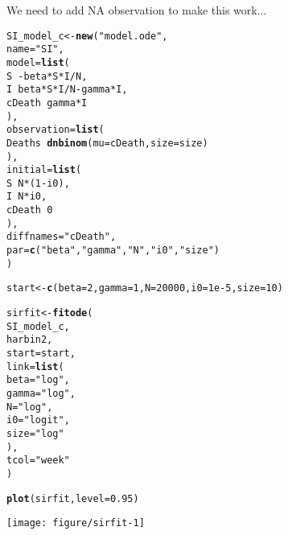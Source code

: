 \documentclass{article}\usepackage[]{graphicx}\usepackage[]{color}
\makeatletter
\def\maxwidth{ %
  \ifdim\Gin@nat@width>\linewidth
    \linewidth
  \else
    \Gin@nat@width
  \fi
}
\newcommand{\hlnum}[1]{\textcolor[rgb]{0.686,0.059,0.569}{#1}}%
\newcommand{\hlstr}[1]{\textcolor[rgb]{0.192,0.494,0.8}{#1}}%
\newcommand{\hlopt}[1]{\textcolor[rgb]{0,0,0}{#1}}%
\newcommand{\hlstd}[1]{\textcolor[rgb]{0.345,0.345,0.345}{#1}}%
\newcommand{\hlkwb}[1]{\textcolor[rgb]{0.69,0.353,0.396}{#1}}%
\newcommand{\hlkwc}[1]{\textcolor[rgb]{0.333,0.667,0.333}{#1}}%
\newcommand{\hlkwd}[1]{\textcolor[rgb]{0.737,0.353,0.396}{\textbf{#1}}}%
\newenvironment{kframe}{%
 \def\at@end@of@kframe{}%
 \ifinner\ifhmode%
  \def\at@end@of@kframe{\end{minipage}}%
  \begin{minipage}{\columnwidth}%
 \fi\fi%
 \def\FrameCommand##1{\hskip\@totalleftmargin \hskip-\fboxsep
 \colorbox{shadecolor}{##1}\hskip-\fboxsep
     \hskip-\linewidth \hskip-\@totalleftmargin \hskip\columnwidth}%
 \MakeFramed {\advance\hsize-\width
   \@totalleftmargin\z@ \linewidth\hsize
   \@setminipage}}%
 {\par\unskip\endMakeFramed%
 \at@end@of@kframe}
\newenvironment{knitrout}{}{} %
\makeatother
\begin{document}
We need to add NA observation to make this work...

\begin{knitrout}
\color{fgcolor}\begin{kframe}
\begin{alltt}
\hlstd{SI_model_c} \hlkwb{<-} \hlkwd{new}\hlstd{(}\hlstr{"model.ode"}\hlstd{,}
    \hlkwc{name} \hlstd{=} \hlstr{"SI"}\hlstd{,}
    \hlkwc{model} \hlstd{=} \hlkwd{list}\hlstd{(}
        \hlstd{S} \hlopt{~ -} \hlstd{beta}\hlopt{*}\hlstd{S}\hlopt{*}\hlstd{I}\hlopt{/}\hlstd{N,}
        \hlstd{I} \hlopt{~} \hlstd{beta}\hlopt{*}\hlstd{S}\hlopt{*}\hlstd{I}\hlopt{/}\hlstd{N} \hlopt{-} \hlstd{gamma}\hlopt{*}\hlstd{I,}
        \hlstd{cDeath} \hlopt{~} \hlstd{gamma}\hlopt{*}\hlstd{I}
    \hlstd{),}
    \hlkwc{observation} \hlstd{=} \hlkwd{list}\hlstd{(}
        \hlstd{Deaths} \hlopt{~} \hlkwd{dnbinom}\hlstd{(}\hlkwc{mu}\hlstd{=cDeath,} \hlkwc{size}\hlstd{=size)}
    \hlstd{),}
    \hlkwc{initial} \hlstd{=} \hlkwd{list}\hlstd{(}
        \hlstd{S} \hlopt{~} \hlstd{N} \hlopt{*} \hlstd{(}\hlnum{1} \hlopt{-} \hlstd{i0),}
        \hlstd{I} \hlopt{~} \hlstd{N} \hlopt{*} \hlstd{i0,}
        \hlstd{cDeath} \hlopt{~} \hlnum{0}
    \hlstd{),}
    \hlkwc{diffnames}\hlstd{=}\hlstr{"cDeath"}\hlstd{,}
    \hlkwc{par}\hlstd{=}\hlkwd{c}\hlstd{(}\hlstr{"beta"}\hlstd{,} \hlstr{"gamma"}\hlstd{,} \hlstr{"N"}\hlstd{,} \hlstr{"i0"}\hlstd{,} \hlstr{"size"}\hlstd{)}
\hlstd{)}

\hlstd{start} \hlkwb{<-} \hlkwd{c}\hlstd{(}\hlkwc{beta}\hlstd{=}\hlnum{2}\hlstd{,} \hlkwc{gamma}\hlstd{=}\hlnum{1}\hlstd{,} \hlkwc{N}\hlstd{=}\hlnum{20000}\hlstd{,} \hlkwc{i0}\hlstd{=}\hlnum{1e-5}\hlstd{,} \hlkwc{size}\hlstd{=}\hlnum{10}\hlstd{)}

\hlstd{sirfit} \hlkwb{<-} \hlkwd{fitode}\hlstd{(}
    \hlstd{SI_model_c,}
    \hlstd{harbin2,}
    \hlkwc{start}\hlstd{=start,}
    \hlkwc{link} \hlstd{=} \hlkwd{list}\hlstd{(}
        \hlkwc{beta}\hlstd{=}\hlstr{"log"}\hlstd{,}
        \hlkwc{gamma}\hlstd{=}\hlstr{"log"}\hlstd{,}
        \hlkwc{N}\hlstd{=}\hlstr{"log"}\hlstd{,}
        \hlkwc{i0}\hlstd{=}\hlstr{"logit"}\hlstd{,}
        \hlkwc{size}\hlstd{=}\hlstr{"log"}
    \hlstd{),}
    \hlkwc{tcol}\hlstd{=}\hlstr{"week"}
\hlstd{)}
\end{alltt}


{\ttfamily\noindent\itshape\color{messagecolor}{\#\# Fitting ode ...}}

{\ttfamily\noindent\itshape\color{messagecolor}{\#\# Computing vcov on the original scale ...}}\begin{alltt}
\hlkwd{plot}\hlstd{(sirfit,} \hlkwc{level}\hlstd{=}\hlnum{0.95}\hlstd{)}
\end{alltt}
\end{kframe}
\texttt{[image: figure/sirfit-1]} 

\end{knitrout}
\end{document}

